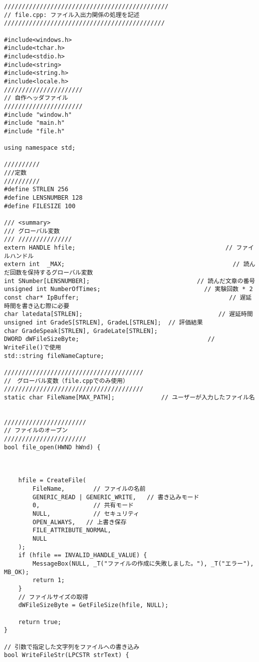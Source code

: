 \begin{lstlisting}[caption=file.cpp]
//////////////////////////////////////////////
// file.cpp: ファイル入出力関係の処理を記述
/////////////////////////////////////////////

#include<windows.h>
#include<tchar.h>
#include<stdio.h>
#include<string>
#include<string.h>
#include<locale.h>
//////////////////////
// 自作ヘッダファイル
//////////////////////
#include "window.h"
#include "main.h"
#include "file.h"

using namespace std;

//////////
///定数
//////////
#define STRLEN 256
#define LENSNUMBER 128
#define FILESIZE 100

/// <summary>
/// グローバル変数
/// ///////////////
extern HANDLE hfile;                                          // ファイルハンドル
extern int  _MAX;                                               // 読んだ回数を保持するグローバル変数
int SNumber[LENSNUMBER];                              // 読んだ文章の番号
unsigned int NumberOfTimes;                             // 実験回数 * 2
const char* IpBuffer;                                          // 遅延時間を書き込む際に必要
char latedata[STRLEN];                                      // 遅延時間
unsigned int GradeS[STRLEN], GradeL[STRLEN];  // 評価結果
char GradeSpeak[STRLEN], GradeLate[STRLEN];
DWORD dWFileSizeByte;                                    // WriteFile()で使用
std::string fileNameCapture;

///////////////////////////////////////
//　グローバル変数（file.cppでのみ使用）
///////////////////////////////////////
static char FileName[MAX_PATH];             // ユーザーが入力したファイル名


///////////////////////
// ファイルのオープン
///////////////////////
bool file_open(HWND hWnd) {

	

	hfile = CreateFile(
		FileName,        // ファイルの名前
		GENERIC_READ | GENERIC_WRITE,   // 書き込みモード
		0,               // 共有モード 
		NULL,            // セキュリティ
		OPEN_ALWAYS,   // 上書き保存
		FILE_ATTRIBUTE_NORMAL,
		NULL
	);
	if (hfile == INVALID_HANDLE_VALUE) {
		MessageBox(NULL, _T("ファイルの作成に失敗しました。"), _T("エラー"), MB_OK);
		return 1;
	}
	// ファイルサイズの取得
	dWFileSizeByte = GetFileSize(hfile, NULL);

	return true;
}

// 引数で指定した文字列をファイルへの書き込み
bool WriteFileStr(LPCSTR strText) {


\end{lstlisting}
